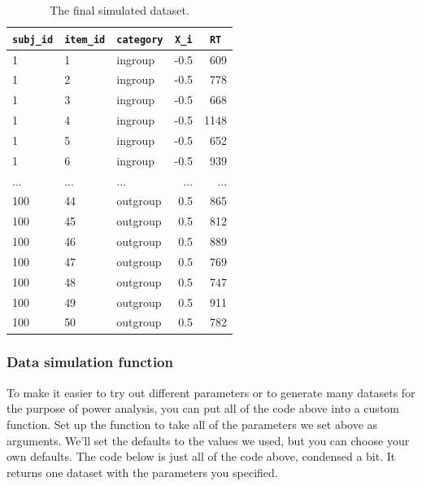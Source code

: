 \documentclass[
  english,
  doc,floatsintext]{apa6}
\begin{document}
\begin{table}[H]

\begin{center}
\begin{threeparttable}

\caption{\label{tab:dat-sim-table}The final simulated dataset.}

\begin{tabular}{lllrr}
\toprule
\texttt{subj\_id} & \multicolumn{1}{c}{\texttt{item\_id}} & \multicolumn{1}{c}{\texttt{category}} & \multicolumn{1}{c}{\texttt{X\_i}} & \multicolumn{1}{c}{\texttt{RT}}\\
\midrule
1 & 1 & ingroup & -0.5 & 609\\
1 & 2 & ingroup & -0.5 & 778\\
1 & 3 & ingroup & -0.5 & 668\\
1 & 4 & ingroup & -0.5 & 1148\\
1 & 5 & ingroup & -0.5 & 652\\
1 & 6 & ingroup & -0.5 & 939\\
... & ... & ... & ... & ...\\
100 & 44 & outgroup & 0.5 & 865\\
100 & 45 & outgroup & 0.5 & 812\\
100 & 46 & outgroup & 0.5 & 889\\
100 & 47 & outgroup & 0.5 & 769\\
100 & 48 & outgroup & 0.5 & 747\\
100 & 49 & outgroup & 0.5 & 911\\
100 & 50 & outgroup & 0.5 & 782\\
\bottomrule
\end{tabular}

\end{threeparttable}
\end{center}

\end{table}

\hypertarget{data-simulation-function}{%
\subsubsection{Data simulation function}\label{data-simulation-function}}

To make it easier to try out different parameters or to generate many datasets for the purpose of power analysis, you can put all of the code above into a custom function. Set up the function to take all of the parameters we set above as arguments. We'll set the defaults to the values we used, but you can choose your own defaults. The code below is just all of the code above, condensed a bit. It returns one dataset with the parameters you specified.
\end{document}
